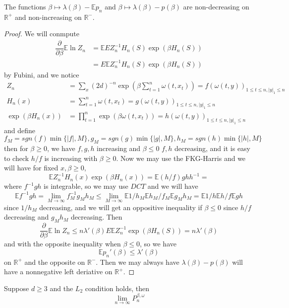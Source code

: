 \begin{theorem}
    The functions $\beta \mapsto \lambda(\beta) - \mathbb{E}p_n$ and $\beta \mapsto \lambda(\beta) - p(\beta)$ are non-decreasing on $\mathbb{R}^+$ and non-increasing on $\mathbb{R}^-$.
\end{theorem}
\begin{proof}
    We will conmpute
    \[
    \begin{aligned}
        \dfrac{\partial}{\partial \beta} \mathbb{E} \ln Z_n &= \mathbb{E} EZ_n^{-1}H_n(S)\exp(\beta H_n(S))\\
        &= E \mathbb{E} Z_n^{-1}H_n(S)\exp{(\beta H_n(S))} 
    \end{aligned}
    \]
    by Fubini, and we notice
    \[
    \begin{aligned}
    Z_n &= \sum\limits_{x} (2d)^{-n} \exp(\beta \sum\limits_{t=1}^n \omega(t,x_t)) = f(\omega(t,y))_{1\leq t\leq n, |y|_1 \leq n}\\
    H_n(x) &= \sum\limits_{t=1}^n \omega(t,x_t) = g(\omega(t,y))_{1\leq t\leq n, |y|_1 \leq n}\\
    \exp(\beta H_n(x)) &= \prod_{t=1}^n \exp{(\beta \omega(t,x_t))} = h(\omega(t,y))_{1\leq t\leq n, |y|_1 \leq n}
    \end{aligned}
    \]
    and define
    \[
    f_M = sgn(f)\min\{|f|,M\}, g_M = sgn(g)\min\{|g|,M\}, h_M = sgn(h)\min\{|h|,M\}
    \]
    then for $\beta \geq 0$, we have $f,g,h$ increasing and $\beta \leq 0$ $f,h$ decreasing, and it is easy to check $h/f$ is increasing with $\beta \geq 0$. Now we may use the FKG-Harris and we will have for fixed $x, \beta \geq 0$,
    \[
    \mathbb{E}Z_n^{-1} H_n(x)\exp{(\beta H_n(x))} = \mathbb{E} (h/f)gh h^{-1} =
    \]
    where $f^{-1}gh$ is integrable, so we may use $DCT$ and we will have
    \[
    \mathbb{E} f^{-1}gh = \lim_{M\to\infty} f_M^{-1} g_M h_M \leq \lim_{M\to\infty} \mathbb{E} 1/h_M \mathbb{E} h_M/f_M \mathbb{E} g_Mh_M = \mathbb{E} 1/h \mathbb{E} h/f \mathbb{E} gh 
    \]
    since $1/h_M$ decreasing, and we will get an oppositive inequality if $\beta \leq 0$ since $h/f$ decreasing and $g_Mh_M$ decreasing. Then
    \[
    \dfrac{\partial}{\partial \beta} \mathbb{E} \ln Z_n \leq n\lambda'(\beta) E\mathbb{E}Z_n^{-1}\exp{(\beta H_n(S))} = n\lambda'(\beta)
    \]
    and with the opposite inequality when $\beta \leq 0$, so we have
    \[
    \mathbb{E}p_n'(\beta) \leq \lambda'(\beta)
    \]
    on $\mathbb{R}^+$ and the opposite on $\mathbb{R}^{-}$. Then we may always have $\lambda(\beta) - p(\beta)$ will have a nonnegative left deriative on $\mathbb{R}^+$.
\end{proof}

\begin{theorem}
    Suppose $d \geq 3$ and the $L_2$ condition holds, then
    \[
    \lim\limits_{n\to\infty} P_{n}^{\beta,\omega} 
    \]
\end{theorem}